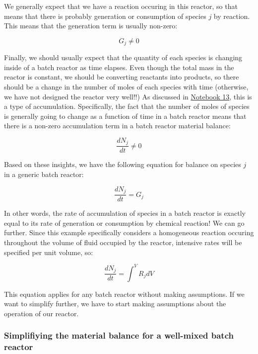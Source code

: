 \documentclass[11pt]{article}
\begin{document}
We generally expect that we have a reaction occuring in this reactor, so
that means that there is probably generation or consumption of species
\(j\) by reaction. This means that the generation term is usually
non-zero:

\[G_j \neq 0\]

Finally, we should usually expect that the quantity of each species is
changing inside of a batch reactor as time elapses. Even though the
total mass in the reactor is constant, we should be converting reactants
into products, so there should be a change in the number of moles of
each species with time (otherwise, we have not designed the reactor very
well!!) As discussed in
\href{https://jqbond.github.io/CEN587/Lectures/587-L10.html\#accumulation-without-flow}{Notebook
13}, this is a type of accumulation. Specifically, the fact that the
number of moles of species is generally going to change as a function of
time in a batch reactor means that there is a non-zero accumulation term
in a batch reactor material balance:

\[\frac{dN_j}{dt} \neq 0\]

Based on these insights, we have the following equation for balance on
species \(j\) in a generic batch reactor:

\[\frac{dN_j}{dt} = G_j\]

In other words, the rate of accumulation of species in a batch reactor
is exactly equal to its rate of generation or consumption by chemical
reaction! We can go further. Since this example specifically considers a
homogeneous reaction occuring throughout the volume of fluid occupied by
the reactor, intensive rates will be specified per unit volume, so:

\[\frac{dN_j}{dt} = \int^V R_jdV\]

This equation applies for any batch reactor without making assumptions.
If we want to simplify further, we have to start making assumptions
about the operation of our reactor.

\hypertarget{simplifiying-the-material-balance-for-a-well-mixed-batch-reactor}{%
\subsubsection{Simplifiying the material balance for a well-mixed batch
reactor}\label{simplifiying-the-material-balance-for-a-well-mixed-batch-reactor}}
\end{document}
